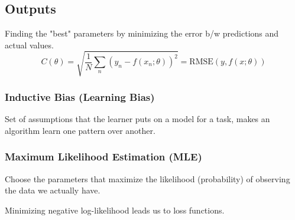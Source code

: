 \subsection{Outputs}
\begin{definition}
    Finding the "best" parameters by minimizing the error b/w predictions and actual values. 
    \begin{equation*}
        C(\theta) = \sqrt{\frac{1}{N} \sum_n (y_n - f(x_n; \theta))^2} = \text{RMSE}(y, f(x; \theta))
    \end{equation*}
\end{definition}

\subsubsection{Inductive Bias (Learning Bias)}
\begin{definition}
    Set of assumptions that the learner puts on a model for a task, makes an algorithm learn one pattern over another.
\end{definition}

\subsubsection{Maximum Likelihood Estimation (MLE)}
\begin{definition}
    Choose the parameters that maximize the likelihood (probability) of observing the data we actually have.
\end{definition}

\begin{warning}
    Minimizing negative log-likelihood leads us to loss functions.
\end{warning}

